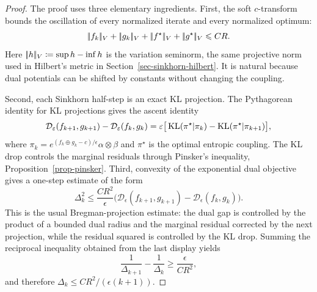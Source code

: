 \begin{proof}
	The proof uses three elementary ingredients. First, the soft $c$-transform bounds the oscillation of every normalized iterate and every normalized optimum:
	\[
		\norm{f_k}_V+\norm{g_k}_V+\norm{f^\star}_V+\norm{g^\star}_V \leq C R.
	\]
	Here $|\!| h |\!|_V\coloneqq\sup h-\inf h$ is the variation seminorm, the same projective norm used in Hilbert's metric in Section~\ref{sec-sinkhorn-hilbert}. It is natural because dual potentials can be shifted by constants without changing the coupling.

	Second, each Sinkhorn half-step is an exact KL projection. The Pythagorean identity for KL projections gives the ascent identity
	\[
		\mathcal D_\varepsilon(f_{k+1},g_{k+1})-
		\mathcal D_\varepsilon(f_k,g_k)
		=
		\varepsilon\big[\operatorname{KL}(\pi^\star|\pi_k)-\operatorname{KL}(\pi^\star|\pi_{k+1})\big],
	\]
	where $\pi_k=e^{(f_k\oplus g_k-c)/\epsilon}\alpha\otimes\beta$ and $\pi^\star$ is the optimal entropic coupling. The KL drop controls the marginal residuals through Pinsker's inequality, Proposition~\ref{prop-pinsker}. Third, convexity of the exponential dual objective gives a one-step estimate of the form
	\[
		\Delta_k^2
		\leq
		\frac{C R^2}{\epsilon}
		\big(\mathcal D_\epsilon(f_{k+1},g_{k+1})-
		\mathcal D_\epsilon(f_k,g_k)\big).
	\]
	This is the usual Bregman-projection estimate: the dual gap is controlled by the product of a bounded dual radius and the marginal residual corrected by the next projection, while the residual squared is controlled by the KL drop. Summing the reciprocal inequality obtained from the last display yields
	\[
		\frac{1}{\Delta_{k+1}}-\frac{1}{\Delta_k}
		\geq \frac{\epsilon}{C R^2},
	\]
	and therefore $\Delta_k\leq C R^2/(\epsilon(k+1))$.
\end{proof}

